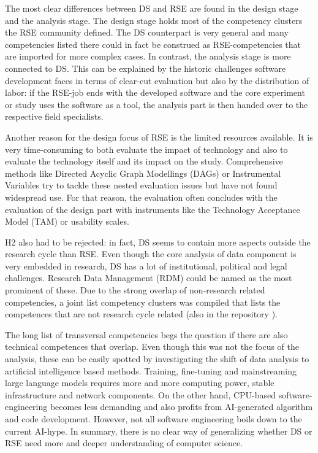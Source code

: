 \documentclass[
        english,biblatex
    ]{lni}
\begin{document}
    The most clear differences between DS and RSE are found in the
    design stage and the analysis stage. The design stage holds most of
    the competency clusters the RSE community defined. The DS
    counterpart is very general and many competencies listed there could
    in fact be construed as RSE-competencies that are imported for more
    complex cases. In contrast, the analysis stage is more connected to
    DS. This can be explained by the historic challenges software
    development faces in terms of clear-cut evaluation but also by the
    distribution of labor: if the RSE-job ends with the developed
    software and the core experiment or study uses the software as a
    tool, the analysis part is then handed over to the respective field
    specialists.

    Another reason for the design focus of RSE is the limited resources
    available. It is very time-consuming to both evaluate the impact of
    technology and also to evaluate the technology itself and its impact
    on the study. Comprehensive methods like Directed Acyclic Graph
    Modellings (DAGs) or Instrumental Variables try to tackle these
    nested evaluation issues but have not found widespread use. For that
    reason, the evaluation often concludes with the evaluation of the
    design part with instruments like the Technology Acceptance Model
    (TAM) or usability scales.

    H2 also had to be rejected: in fact, DS seems to contain more
    aspects outside the research cycle than RSE. Even though the core
    analysis of data component is very embedded in research, DS has a
    lot of institutional, political and legal challenges. Research Data
    Management (RDM) could be named as the most prominent of these. Due
    to the strong overlap of non-research related competencies, a joint
    list competency clusters was compiled that lists the competences
    that are not research cycle related (also in the repository
    \autocite{ds2rse2025}).

    The long list of transversal competencies begs the question if there
    are also technical competences that overlap. Even though this was
    not the focus of the analysis, these can be easily spotted by
    investigating the shift of data analysis to artificial intelligence
    based methods. Training, fine-tuning and mainstreaming large
    language models requires more and more computing power, stable
    infrastructure and network components. On the other hand, CPU-based
    software-engineering becomes less demanding and also profits from
    AI-generated algorithm and code development. However, not all
    software engineering boils down to the current AI-hype. In summary,
    there is no clear way of generalizing whether DS or RSE need more
    and deeper understanding of computer science.
\end{document}
